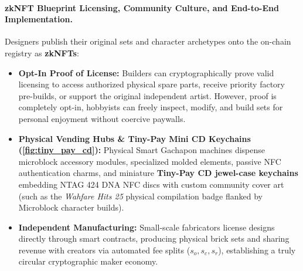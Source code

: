 \documentclass[a4paper,11pt,twoside,parskip=half-,headings=small]{scrartcl}
\begin{document}
\paragraph{zkNFT Blueprint Licensing, Community Culture, and End-to-End Implementation.}
Designers publish their original sets and character archetypes onto the on-chain registry as \textbf{zkNFTs}:
\begin{itemize}[nosep]
  \item \textbf{Opt-In Proof of License:} Builders can cryptographically prove valid licensing to access authorized physical spare parts, receive priority factory pre-builds, or support the original independent artist. However, proof is completely opt-in, hobbyists can freely inspect, modify, and build sets for personal enjoyment without coercive paywalls.
  \item \textbf{Physical Vending Hubs \& Tiny-Pay Mini CD Keychains (\cref{fig:tiny_pay_cd}):} Physical Smart Gachapon machines dispense microblock accessory modules, specialized molded elements, passive NFC authentication charms, and miniature \textbf{Tiny-Pay CD jewel-case keychains} embedding NTAG 424 DNA NFC discs with custom community cover art (such as the \emph{Wahfare Hits 25} physical compilation badge flanked by Microblock character builds).
  \item \textbf{Independent Manufacturing:} Small-scale fabricators license designs directly through smart contracts, producing physical brick sets and sharing revenue with creators via automated fee splits ($s_o, s_c, s_r$), establishing a truly circular cryptographic maker economy.
\end{itemize}
\end{document}
